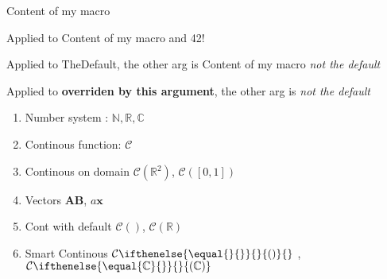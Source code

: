 \documentclass{article}
\newcommand{\mymacro}{Content of my macro }
\newcommand{\macroWithArgs}[2]{Applied to #1 and #2!}
\newcommand{\macroWithDefault}[2][TheDefault]{Applied to #1, the other arg is #2}
\newcommand{\numn}{\mathbb{N}}
\newcommand{\numr}{\mathbb{R}}
\newcommand{\numc}{\mathbb{C}}
\newcommand{\conc}{\mathcal{C}}
\newcommand{\continousON}[1]{\conc{}(#1)}
\newcommand{\vect}[1]{\mathbf{#1}}
\newcommand{\contDef}[1][{}]{\conc{}(#1)}
\newcommand{\smartCont}[1][{}]{
\conc{}%
\ifthenelse{ \equal{#1}{} }
{} %
{(#1)}
}
\begin{document}
\mymacro{}

\macroWithArgs{\mymacro}{42}

\macroWithDefault{\mymacro}{\emph{not the default}} 

\macroWithDefault[\textbf{overriden by this argument}]
{\emph{not the default}}

\begin{enumerate}
    \item Number system : $\numn, \numr ,\numc $
    \item Continous function: $\conc$
    \item  Continous on domain $\continousON {\numr{}^2}$, $\continousON{[0,1]}$
    \item Vectors $\vect{AB}$, $a \vect{x}$
    \item  Cont with default $\contDef$, $\contDef[\numr]$
    \item Smart Continous $\smartCont{}$ , $\smartCont[\numc]$
\end{enumerate}
\end{document}
